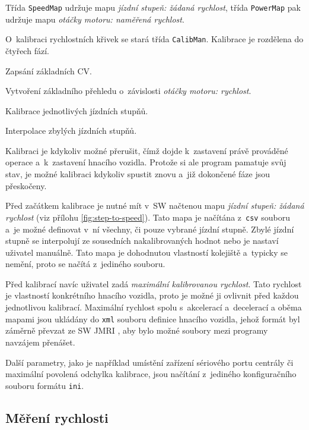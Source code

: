 Třída \texttt{SpeedMap} udržuje mapu \textit{jízdní stupeň: žádaná rychlost},
třída \texttt{Power\-Map} pak udržuje mapu \textit{otáčky motoru: naměřená rychlost}.

O~kalibraci rychlostních křivek se stará třída \texttt{CalibMan}. Kalibrace
je rozdělena do čtyřech fází.

\begin{compactenum}
\item Zapsání základních CV.
\item Vytvoření základního přehledu o~závislosti \textit{otáčky motoru: rychlost}.
\item Kalibrace jednotlivých jízdních stupňů.
\item Interpolace zbylých jízdních stupňů.
\end{compactenum}

Kalibraci je kdykoliv možné přerušit, čímž dojde k~zastavení právě prováděné
operace a~k~zastavení hnacího vozidla. Protože si ale program pamatuje svůj
stav, je možné kalibraci kdykoliv spustit znovu a~již dokončené fáze jsou
přeskočeny.

Před začátkem kalibrace je nutné mít v~SW načtenou mapu \textit{jízdní
stupeň: žádaná rychlost} (viz přílohu \ref{fig:step-to-speed}). Tato mapa je
načítána z~\texttt{csv} souboru a~je možné definovat v~ní všechny, či pouze
vybrané jízdní stupně. Zbylé jízdní stupně se interpolují ze sousedních
nakalibrovaných hodnot nebo je nastaví uživatel manuálně. Tato mapa je
dohodnutou vlastností kolejiště a~typicky se nemění, proto se načítá z~jediného
souboru.

Před kalibrací navíc uživatel zadá \textit{maximální kalibrovanou rychlost}.
Tato rychlost je vlastností konkrétního hnacího vozidla, proto je možné ji
ovlivnit před každou jednotlivou kalibrací. Maximální rychlost spolu
s~akcelerací a~decelerací a oběma mapami jsou ukládány do \texttt{xml} souboru
definice hnacího vozidla, jehož formát byl záměrně převzat ze SW JMRI
\cite{jmri:web}, aby bylo možné soubory mezi programy navzájem přenášet.

Další parametry, jako je například umístění zařízení sériového portu centrály
či maximální povolená odchylka kalibrace, jsou načítání z~jediného
konfiguračního souboru formátu \texttt{ini}.

\subsection{Měření rychlosti}
\label{sec:ac:lt-measure}

